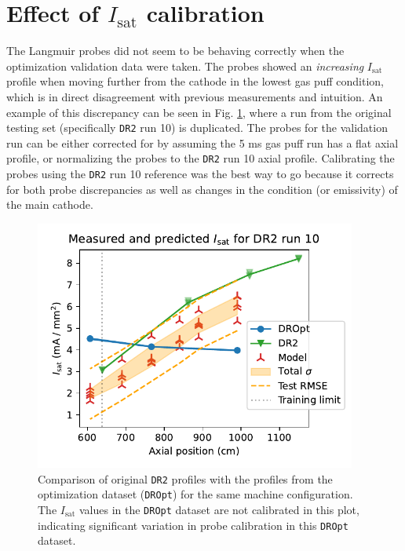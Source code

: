 \section{Effect of $I_\text{sat}$ calibration \label{app:calib}}


The Langmuir probes did not seem to be behaving correctly when the optimization validation data were taken. The probes showed an \emph{increasing} $I_\text{sat}$ profile when moving further from the cathode in the lowest gas puff condition, which is in direct disagreement with previous measurements and intuition. An example of this discrepancy can be seen in Fig. \ref{fig:DR2-10_LHS-30_valdiation}, where a run from the original testing set (specifically \texttt{DR2} run 10) is duplicated. The probes for the validation run can be either corrected for by assuming the 5 ms gas puff run has a flat axial profile, or normalizing the probes to the \texttt{DR2} run 10 axial profile. Calibrating the probes using the \texttt{DR2} run 10 reference was the best way to go because it corrects for both probe discrepancies as well as changes in the condition (or emissivity) of the main cathode. 

\begin{figure}
	\centering
	\includegraphics[width=300pt]{figures/DR2-10_LHS-30_valdiation.pdf}
	\caption[size=12]{\label{fig:DR2-10_LHS-30_valdiation}Comparison of original \texttt{DR2} profiles with the profiles from the optimization dataset (\texttt{DROpt}) for the same machine configuration. The $I_\text{sat}$ values in the \texttt{DROpt} dataset are not calibrated in this plot, indicating significant variation in probe calibration in this \texttt{DROpt} dataset.}
\end{figure}


